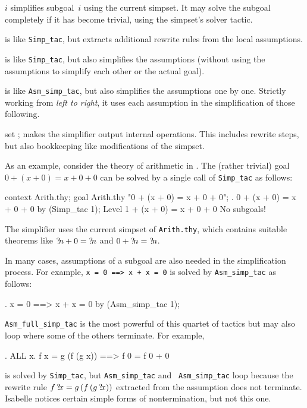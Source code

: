 \begin{ttdescription}
\item[\ttindexbold{Simp_tac} $i$] simplifies subgoal~$i$ using the
  current simpset.  It may solve the subgoal completely if it has
  become trivial, using the simpset's solver tactic.
  
\item[\ttindexbold{Asm_simp_tac}]
  is like \verb$Simp_tac$, but extracts additional rewrite rules from
  the local assumptions.
  
\item[\ttindexbold{Full_simp_tac}] is like \verb$Simp_tac$, but also
  simplifies the assumptions (without using the assumptions to
  simplify each other or the actual goal).
  
\item[\ttindexbold{Asm_full_simp_tac}] is like \verb$Asm_simp_tac$,
  but also simplifies the assumptions one by one.  Strictly working
  from \emph{left to right}, it uses each assumption in the
  simplification of those following.
  
\item[set \ttindexbold{trace_simp};] makes the simplifier output
  internal operations.  This includes rewrite steps, but also
  bookkeeping like modifications of the simpset.
\end{ttdescription}

\medskip

As an example, consider the theory of arithmetic in \HOL.  The (rather
trivial) goal $0 + (x + 0) = x + 0 + 0$ can be solved by a single call
of \texttt{Simp_tac} as follows:
\begin{ttbox}
context Arith.thy;
goal Arith.thy "0 + (x + 0) = x + 0 + 0";
{. 0 + (x + 0) = x + 0 + 0}
by (Simp_tac 1);
{\out Level 1}
{ + (x + 0) = x + 0 + 0}
{\out No subgoals!}
\end{ttbox}

The simplifier uses the current simpset of \texttt{Arith.thy}, which
contains suitable theorems like ${?\!n}+0 = {?\!n}$ and $0+{?\!n} =
{?\!n}$.

\medskip In many cases, assumptions of a subgoal are also needed in
the simplification process.  For example, \texttt{x = 0 ==> x + x = 0}
is solved by \texttt{Asm_simp_tac} as follows:
\begin{ttbox}
{. x = 0 ==> x + x = 0}
by (Asm_simp_tac 1);
\end{ttbox}

\medskip \texttt{Asm_full_simp_tac} is the most powerful of this quartet
of tactics but may also loop where some of the others terminate.  For
example,
\begin{ttbox}
{. ALL x. f x = g (f (g x)) ==> f 0 = f 0 + 0}
\end{ttbox}
is solved by \texttt{Simp_tac}, but \texttt{Asm_simp_tac} and {\tt
  Asm_simp_tac} loop because the rewrite rule $f\,{?\!x} =
g\,(f\,(g\,{?\!x}))$ extracted from the assumption does not
terminate.  Isabelle notices certain simple forms of nontermination,
but not this one.
 
